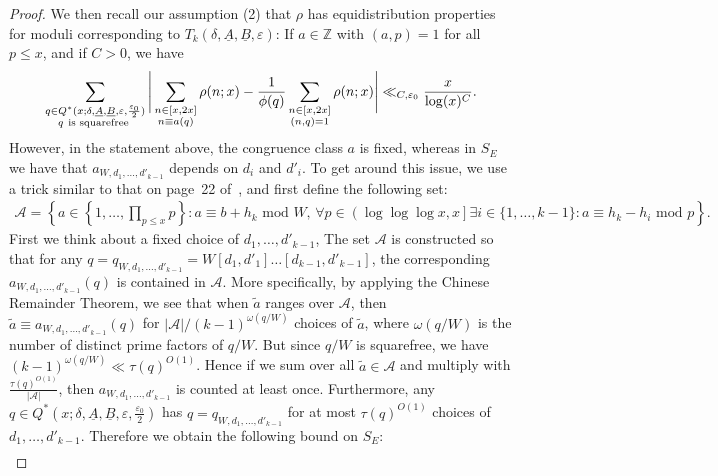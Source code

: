 \documentclass{amsart}
\numberwithin{equation}{section}
\begin{document}
\begin{proof}
\medskip We then recall our assumption (2) that $\rho$ has  equidistribution properties for  moduli corresponding to $T_k(\delta,\underline{A},\underline{B},\varepsilon)$: If $a \in \mathbb{Z}$ with $(a,p)=1$ for all $p \leq x$, and if $C>0$, we have 
\begin{align}\label{inequ:equidist}
\sum_{\substack{q \in Q^*(x;\delta,\underline{A},\underline{B},\varepsilon,\frac{\varepsilon_0}{2}) \\  q \mbox{ \scriptsize  is squarefree  }  }} \Bigg| \sum_{\substack{n \in [x,2x] \\ n \equiv a (q)}} \rho(n;x) - \dfrac{1}{\phi(q)} \sum_{\substack{n \in [x,2x] \\(n,q)=1 }}\rho(n;x) \Bigg| \ll_{C,\varepsilon_0} \dfrac{x}{\log(x)^C}.
\end{align}
However, in the statement above, the congruence class $a$ is fixed, whereas in $S_E$ we have that  $a_{W,d_1, \dots, d'_{k-1}}$ depends on $d_i$ and $d'_i$. To get around this issue, we use a trick similar to that on page~22 of~\cite{Polymath:2014:VSS}, and first define the following set: 
\begin{align*}
\mathcal{A} = \left\{ a \in \left\{1, \dots, \prod_{p \leq x} p  \right\}: a \equiv b +h_k \mbox{ mod } W,  \, \forall p \in \left(\log\log\log x, x \right] \exists i \in \{1, \dots, k-1\}:  a \equiv h_k -h_i \mbox{ mod } p\right\}.
\end{align*}
First we think about a fixed choice of $d_1, \dots, d'_{k-1}$, The set $\mathcal{A}$ is constructed so that for any $q=q_{W,d_1, \dots, d'_{k-1}}  = W [d_1,d'_1] \dots [d_{k-1},d'_{k-1}]$, the corresponding $a_{W,d_1, \dots, d'_{k-1}} (q)$ is contained in $\mathcal{A}$. More specifically, by applying the Chinese Remainder Theorem, we see that when $\widetilde{a}$ ranges over $\mathcal{A}$, then $\widetilde{a} \equiv a_{W,d_1, \dots, d'_{k-1}} (q)$ for $|\mathcal{A}|/(k-1)^{\omega(q/W)}$ choices of $\widetilde{a}$, where $\omega(q/W)$ is the number of distinct prime factors of $q/W$. But since $q/W$ is squarefree, we have $(k-1)^{\omega(q/W)} \ll \tau(q)^{O(1)}$. Hence if we sum over all $\widetilde{a} \in \mathcal{A}$ and multiply with $\frac{\tau(q)^{O(1)}}{|\mathcal{A}|}$, then $a_{W,d_1, \dots, d'_{k-1}} $ is counted at least once. Furthermore, any $q \in Q^*(x;\delta,\underline{A},\underline{B},\varepsilon,\frac{\varepsilon_0}{2})$ has $q=q_{W,d_1, \dots, d'_{k-1}} $ for at most $ \tau(q)^{O(1)} $ choices of $d_1, \dots, d'_{k-1}$. Therefore we obtain the following bound on $S_E$:
  \begin{align*}

\end{align*}
\end{proof}
\end{document}
